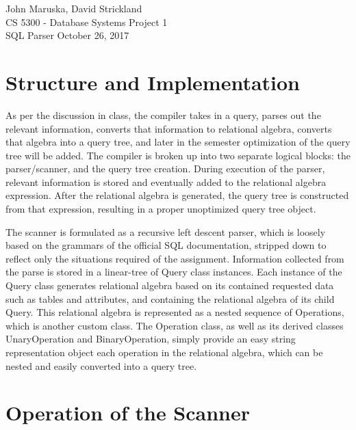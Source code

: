 \documentclass[]{article}
\begin{document}
	\noindent John Maruska, David Strickland \\
	CS 5300 - Database Systems \hfill Project 1 \\
	SQL Parser \hfill October 26, 2017
	
	\noindent\hrulefill 
	\doublespacing

	\section{Structure and Implementation}
	
	
	
	As per the discussion in class, the compiler takes in a query, parses out the relevant information, converts that information to relational algebra, converts that algebra into a query tree, and later in the semester optimization of the query tree will be added. The compiler is broken up into two separate logical blocks: the parser/scanner, and the query tree creation. During execution of the parser, relevant information is stored and eventually added to the relational algebra expression. After the relational algebra is generated, the query tree is constructed from that expression, resulting in a proper unoptimized query tree object.
	
	The scanner is formulated as a recursive left descent parser, which is loosely based on the grammars of the official SQL documentation, stripped down to reflect only the situations required of the assignment. Information collected from the parse is stored in a linear-tree of Query class instances. Each instance of the Query class generates relational algebra based on its contained requested data such as tables and attributes, and containing the relational algebra of its child Query. This relational algebra is represented as a nested sequence of Operations, which is another custom class. The Operation class, as well as its derived classes UnaryOperation and BinaryOperation, simply provide an easy string representation object each operation in the relational algebra, which can be nested and easily converted into a query tree. 

	
	\section{Operation of the Scanner}
	
\end{document}
